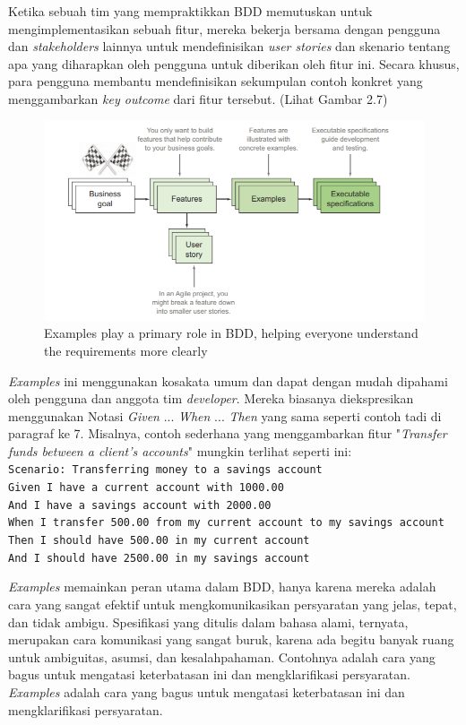 Ketika sebuah tim yang mempraktikkan BDD memutuskan untuk mengimplementasikan sebuah fitur, mereka bekerja bersama dengan pengguna dan \textit{stakeholders} lainnya untuk mendefinisikan \textit{user stories} dan skenario tentang apa yang diharapkan oleh pengguna untuk diberikan oleh fitur ini. Secara khusus, para pengguna membantu mendefinisikan sekumpulan contoh konkret yang menggambarkan \textit{key outcome} dari fitur tersebut. (Lihat Gambar 2.7)
\begin{figure}
	\includegraphics[scale=1.2]{gambar/skenario}
	\centering
	\caption{Examples play a primary role in BDD, helping everyone understand the
requirements more clearly}
\end{figure}

\textit{Examples} ini menggunakan kosakata umum dan dapat dengan mudah dipahami oleh pengguna dan anggota tim \textit{developer}. Mereka biasanya diekspresikan menggunakan Notasi \textit{Given} ... \textit{When} ... \textit{Then} yang sama seperti contoh tadi di paragraf ke 7. Misalnya, contoh sederhana yang menggambarkan fitur "\textit{Transfer funds between a client’s accounts}" mungkin terlihat seperti ini:\\
\texttt{Scenario: Transferring money to a savings account\\
 Given I have a current account with 1000.00\\
 And I have a savings account with 2000.00\\
 When I transfer 500.00 from my current account to my savings account\\
 Then I should have 500.00 in my current account\\
 And I should have 2500.00 in my savings account\\}
 
\textit{Examples} memainkan peran utama dalam BDD, hanya karena mereka adalah cara yang sangat efektif untuk mengkomunikasikan persyaratan yang jelas, tepat, dan tidak ambigu. Spesifikasi yang ditulis dalam bahasa alami, ternyata, merupakan cara komunikasi yang sangat buruk, karena ada begitu banyak ruang untuk ambiguitas, asumsi, dan kesalahpahaman. Contohnya adalah cara yang bagus untuk mengatasi keterbatasan ini dan mengklarifikasi persyaratan. \textit{Examples} adalah cara yang bagus untuk mengatasi keterbatasan ini dan mengklarifikasi persyaratan. 
